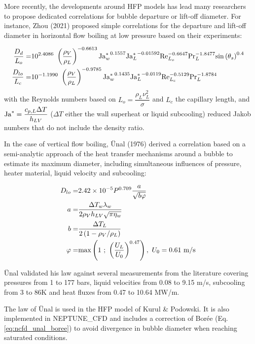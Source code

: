 \npar
More recently, the developments around HFP models has lead many researchers to propose dedicated correlations for bubble departure or lift-off diameter. For instance, Zhou \etal (2021) \cite{zhou_mechanistic_2021} proposed simple correlations for the departure and lift-off diameter in horizontal flow boiling at low pressure based on their experiments:

\begin{align}
\frac{D_{d}}{L_{o}} =& 10^{2.4086}\ \parth{\frac{\rho_{V}}{\rho_{L}}}^{-0.6613} {\Ja^{*}_{w}}^{0.1557} {\Ja^{*}_{L}}^{-0.01592} \Re_{L_{o}}^{-0.6647} \Pr_{L}^{-1.8477} \sin{\theta_{s}}^{0.4}
\label{eq:dd_zhou}
\\
%
\frac{D_{lo}}{L_{c}} =& 10^{-1.1990}\ \parth{\frac{\rho_{V}}{\rho_{L}}}^{-0.9785} {\Ja^{*}_{w}}^{0.1435} {\Ja^{*}_{L}}^{-0.0119} \Re_{L_{c}}^{-0.5129} \Pr_{L}^{-1.8784}
\label{eq:dlo_zhou}
\end{align}
with the Reynolds numbers based on $L_{o} = \dfrac{\rho_{L}\nu_{L}^{2}}{\sigma}$ and $L_{c}$ the capillary length, and $\mathrm{Ja}^{*} = \dfrac{c_{p,L}\Delta T}{h_{LV}}$ ($\Delta T$ either the wall superheat or liquid subcooling) reduced Jakob numbers that do not include the density ratio. 


\npar


In the case of vertical flow boiling, \"Unal (1976)\cite{unal_maximum_1976} derived a correlation based on a semi-analytic approach of the heat transfer mechanisms around a bubble to estimate its maximum diameter, including simultaneous influences of pressure, heater material, liquid velocity and subcooling:

\begin{align}
D_{lo}=& 2.42\times 10^{-5} P^{0.709}\frac{a}{\sqrt{b\varphi}}
\label{eq:dlo_unal}
\\
\nonumber a =& \frac{\Delta T_{w}\lambda_{w}}{2\rho_{V}h_{LV}\sqrt{\pi \eta_{w}} }\\
\nonumber b =& \frac{\Delta T_{L}}{2\left( 1-\rho_{V}/\rho_{L} \right)}\\
\nonumber \varphi=& \mathrm{max}\left( 1\ ;\ \left( \frac{U_{L}}{U_{0}} \right)^{0.47} \right),\ U_{0}=0.61~\mathrm{m/s}
\end{align}

\"Unal validated his law against several measurements from the literature covering pressures from 1 to 177 bars, liquid velocities from 0.08 to 9.15 m/s, subcooling from 3 to 86K and heat fluxes from 0.47 to 10.64 MW/m.


\begin{note*}{}
The law of \"Unal is used in the HFP model of Kurul \& Podowski. It is also implemented in NEPTUNE\_CFD and includes a correction of Borée \etal (Eq. \ref{eq:ncfd_unal_boree}) to avoid divergence in bubble diameter when reaching saturated conditions.
\end{note*}

